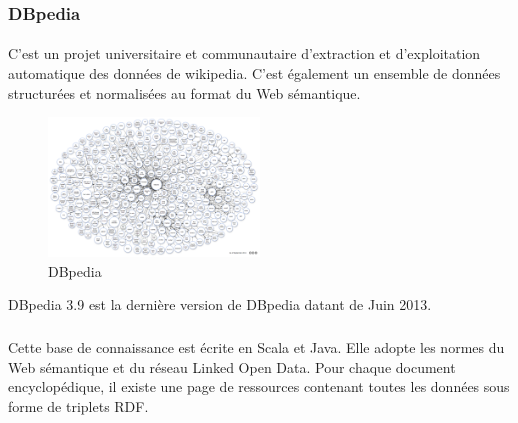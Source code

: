 \documentclass[12pt,a4	]{report}
\begin{document}
\subsubsection*{DBpedia}
\paragraph{}

C'est un projet universitaire et communautaire d’extraction et d’exploitation automatique des données de wikipedia. C’est également un ensemble de données structurées et normalisées au format du Web sémantique.
\begin{figure}
  \vspace{-10pt}
  \begin{center}
    \includegraphics[width=0.50\textwidth]{dbpedia.png}
  \end{center}
  \vspace{-15pt}
  \caption{DBpedia}
  \vspace{-10pt}
\end{figure}
DBpedia 3.9 est la dernière version de DBpedia datant de Juin 2013. 
\subparagraph{}
Cette base de connaissance est écrite en Scala et Java. Elle adopte les normes du Web sémantique et du réseau Linked Open Data. Pour chaque document encyclopédique, il existe une page de ressources contenant toutes les données sous forme de triplets RDF.
\newpage
\end{document}
